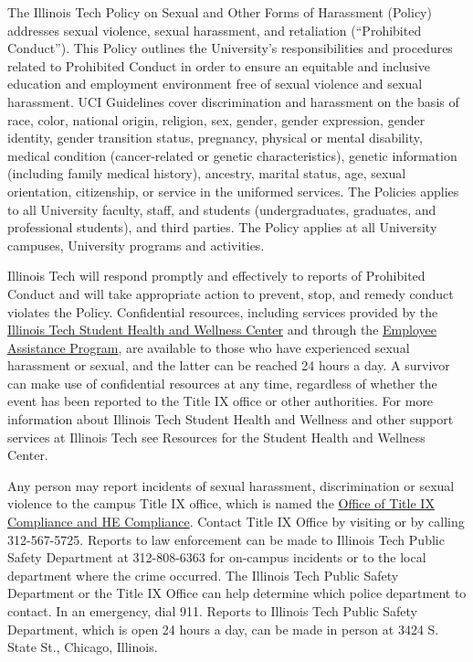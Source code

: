 \documentclass[12pt,lettersize,oneside]{book} %
\begin{document}
The Illinois Tech Policy on Sexual and Other Forms of Harassment (Policy) addresses sexual violence, sexual harassment, and retaliation (“Prohibited Conduct”). This Policy outlines the University’s responsibilities and procedures related to Prohibited Conduct in order to ensure an equitable and inclusive education and employment environment free of sexual violence and sexual harassment. UCI Guidelines cover discrimination and harassment on the basis of race, color, national origin, religion, sex, gender, gender expression, gender identity, gender transition status, pregnancy, physical or mental disability, medical condition (cancer-related or genetic characteristics), genetic information (including family medical history), ancestry, marital status, age, sexual orientation, citizenship, or service in the uniformed services. The Policies applies to all University faculty, staff, and students (undergraduates, graduates, and professional students), and third parties. The Policy applies at all University campuses, University programs and activities.

Illinois Tech  will respond promptly and effectively to reports of Prohibited Conduct and will take appropriate action to prevent, stop, and remedy conduct violates the Policy.
Confidential resources, including services provided by the \href{https://www.iit.edu/shwc}{Illinois Tech Student Health and Wellness Center}
 and through the \href{https://portal.iit.edu/pages/human-resources-employee-assistance-program}{Employee Assistance Program}, are available to those who have experienced sexual harassment or sexual, and the latter can be reached 24 hours a day. A survivor can make use of confidential resources at any time, regardless of whether the event has been reported to the Title IX office or other authorities. For more information about Illinois Tech Student Health and Wellness and other support services at Illinois Tech see  Resources for the Student Health and Wellness Center.

Any person may report incidents of sexual harassment, discrimination or sexual violence to the campus Title IX office, which is named the
\href{https://www.iit.edu/title-ix}{Office of Title IX Compliance and HE Compliance}. Contact Title IX Office  by visiting  or by calling 312-567-5725.
Reports to law enforcement can be made to Illinois Tech Public Safety Department at 312-808-6363 for on-campus incidents or to the local department where the crime occurred. The Illinois Tech Public Safety Department or the Title IX Office can help determine which police department to contact. In an emergency, dial 911. Reports to Illinois Tech Public Safety Department, which is open 24 hours a day, can be made in person at 3424 S. State St., Chicago, Illinois.
\end{document}
